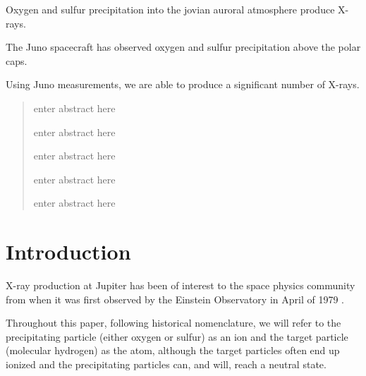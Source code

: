 \documentclass[draft]{agujournal2018}
\begin{document}
\begin{keypoints}
\item Oxygen and sulfur precipitation into the jovian auroral atmosphere produce X-rays.
\item The Juno spacecraft has observed oxygen and sulfur precipitation above the polar caps.
\item Using Juno measurements, we are able to produce a significant number of X-rays.
\end{keypoints}

%
%


\begin{abstract}
enter abstract here


enter abstract here


enter abstract here


enter abstract here


enter abstract here

\end{abstract}



%
%

\section{Introduction}

X-ray production at Jupiter has been of interest to the space physics community from when it was first observed by the Einstein Observatory in April of 1979 \citep{metzger1983}.

Throughout this paper, following historical nomenclature, we will refer to the precipitating particle (either oxygen or sulfur) as an ion and the target particle (molecular hydrogen) as the atom, although the target particles often end up ionized and the precipitating particles can, and will, reach a neutral state.
\end{document}
